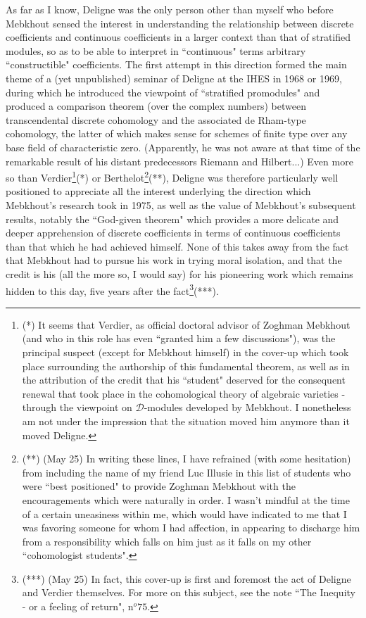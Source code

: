 As far as I know, Deligne was the only person other than myself who before Mebkhout sensed the interest in understanding the relationship between discrete coefficients and continuous coefficients in a larger context than that of stratified modules, so as to be able to interpret in ``continuous" terms arbitrary ``constructible" coefficients. The first attempt in this direction formed the main theme of a (yet unpublished) seminar of Deligne at the IHES in 1968 or 1969, during which he introduced the viewpoint of ``stratified promodules" and produced a comparison theorem (over the complex numbers) between transcendental discrete cohomology and the associated de Rham-type cohomology, the latter of which makes sense for schemes of finite type over any base field of characteristic zero. (Apparently, he was not aware at that time of the remarkable result of his distant predecessors Riemann and Hilbert...) Even more so than Verdier\footnote{(*) It seems that Verdier, as official doctoral advisor of Zoghman Mebkhout (and who in this role has even ``granted him a few discussions"), was the principal suspect (except for Mebkhout himself) in the cover-up which took place surrounding the authorship of this fundamental theorem, as well as in the attribution of the credit that his ``student" deserved for the consequent renewal that took place in the cohomological theory of algebraic varieties - through the viewpoint on $\mathcal{D}$-modules developed by Mebkhout. I nonetheless am not under the impression that the situation moved him anymore than it moved Deligne.}(*) or Berthelot\footnote{(**) (May 25) In writing these lines, I have refrained (with some hesitation) from including the name of my friend Luc Illusie in this list of students who were ``best positioned" to provide Zoghman Mebkhout with the encouragements which were naturally in order. I wasn't mindful at the time of a certain uneasiness within me, which would have indicated to me that I was favoring someone for whom I had affection, in appearing to discharge him from a responsibility which falls on him just as it falls on my other ``cohomologist students".}(**), Deligne was therefore particularly well positioned to appreciate all the interest underlying the direction which Mebkhout's research took in 1975, as well as the value of Mebkhout's subsequent results, notably the ``God-given theorem" which provides a more delicate and deeper apprehension of discrete coefficients in terms of continuous coefficients than that which he had achieved himself. None of this takes away from the fact that Mebkhout had to pursue his work in trying moral isolation, and that the credit is his (all the more so, I would say) for his pioneering work which remains hidden to this day, five years after the fact\footnote{(***) (May 25) In fact, this cover-up is first and foremost the act of Deligne and Verdier themselves. For more on this subject, see the note ``The Inequity - or a feeling of return", n$^o 75$.
}(***).

